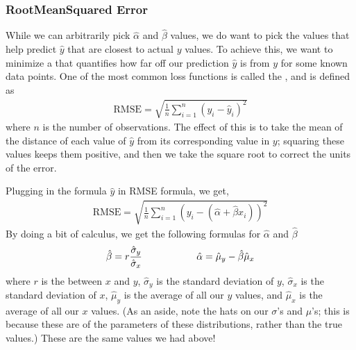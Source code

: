 \documentclass[letterpaper,10pt,english]{jupyterBook}
\begin{document}
\subsubsection{Root\sphinxhyphen{}Mean\sphinxhyphen{}Squared Error}
\label{\detokenize{content/11-econometrics/single-variable:root-mean-squared-error}}
\sphinxAtStartPar
While we can arbitrarily pick \(\hat{\alpha}\) and \(\hat{\beta}\) values, we do want to pick the values that help predict \(\hat{y}\) that are closest to actual \(y\) values. To achieve this, we want to minimize a  that quantifies how far off our prediction \(\hat{y}\) is from \(y\) for some known data points. One of the most common loss functions is called the , and is defined as
\begin{equation*}
\begin{split}
\text{RMSE} = \sqrt{ \frac{1}{n} \sum_{i=1}^n \left ( y_i - \hat{y}_i \right ) ^2 }
\end{split}
\end{equation*}
\sphinxAtStartPar
where \(n\) is the number of observations. The effect of this is to take the mean of the distance of each value of \(\hat{y}\) from its corresponding value in \(y\); squaring these values keeps them positive, and then we take the square root to correct the units of the error.

\sphinxAtStartPar
Plugging in the formula \(\hat{y}\) in RMSE formula, we get,
\begin{equation*}
\begin{split}
\text{RMSE} = \sqrt{ \frac{1}{n} \sum_{i=1}^n \left ( y_i - (\hat{\alpha} + \hat{\beta}x_i) \right ) ^2 }
\end{split}
\end{equation*}
\sphinxAtStartPar
By doing a bit of calculus, we get the following formulas for \(\hat{\alpha}\) and \(\hat{\beta}\)
\begin{equation*}
\begin{split}\Large
\hat{\beta} = r\frac {\hat{\sigma}_y} {\hat{\sigma}_x} \qquad \qquad
\hat{\alpha} = \hat{\mu}_y - \hat{\beta}\hat{\mu}_x
\end{split}
\end{equation*}
\sphinxAtStartPar
where \(r\) is the  between \(x\) and \(y\), \(\hat{\sigma}_y\) is the standard deviation of \(y\), \(\hat{\sigma}_x\) is the standard deviation of \(x\), \(\hat{\mu}_y\) is the average of all our \(y\) values, and \(\hat{\mu}_x\) is the average of all our \(x\) values. (As an aside, note the hats on our \(\sigma\)’s and \(\mu\)’s; this is because these are  of the parameters of these distributions, rather than the true values.) These are the same values we had above!
\end{document}
